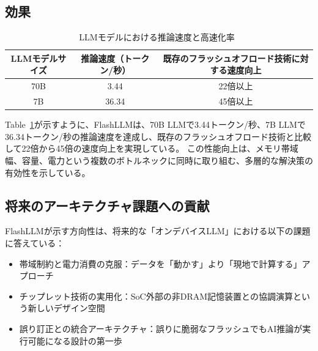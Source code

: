 \documentclass[a4paper, 11pt]{article}
\begin{document}
\subsection{効果}
\begin{table}[h]
  \centering
  \caption{LLMモデルにおける推論速度と高速化率~\cite{yu2024cambriconllmchipletbasedhybridarchitecture}}
  \begin{tabular}{|c|c|c|}
    \hline
    \textbf{LLMモデルサイズ} & \textbf{推論速度（トークン/秒）} & \textbf{既存のフラッシュオフロード技術に対する速度向上} \\
    \hline
    70B & 3.44  & 22倍以上 \\
    7B  & 36.34 & 45倍以上 \\
    \hline
  \end{tabular}
  \label{tab:llm_speedup}
\end{table}
Table~\ref{tab:llm_speedup}が示すように、FlashLLMは、70B LLMで3.44トークン/秒、7B LLMで36.34トークン/秒の推論速度を達成し、既存のフラッシュオフロード技術と比較して22倍から45倍の速度向上を実現している。
この性能向上は、メモリ帯域幅、容量、電力という複数のボトルネックに同時に取り組む、多層的な解決策の有効性を示している。

\subsection{将来のアーキテクチャ課題への貢献}
FlashLLMが示す方向性は、将来的な「オンデバイスLLM」における以下の課題に答えている：
\begin{itemize}
    \item 帯域制約と電力消費の克服：データを「動かす」より「現地で計算する」アプローチ
    \item チップレット技術の実用化：SoC外部の非DRAM記憶装置との協調演算という新しいデザイン空間
    \item 誤り訂正との統合アーキテクチャ：誤りに脆弱なフラッシュでもAI推論が実行可能になる設計の第一歩
\end{itemize}


\end{document}
